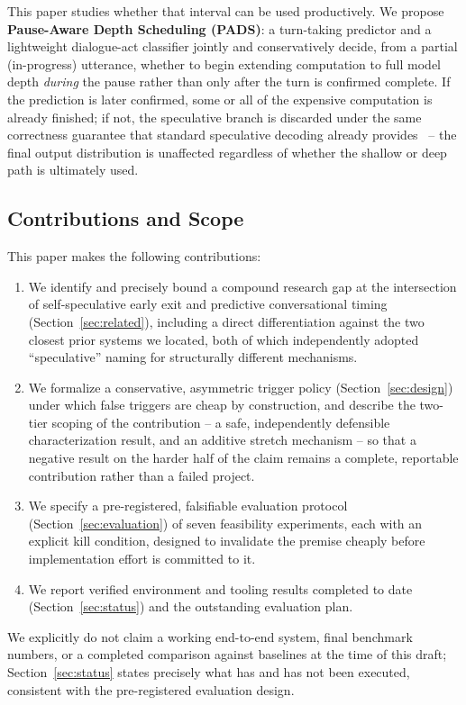 \documentclass[journal]{IEEEtran}
\begin{document}
This paper studies whether that interval can be used productively. We propose \textbf{Pause-Aware Depth Scheduling (PADS)}: a turn-taking predictor and a lightweight dialogue-act classifier jointly and conservatively decide, from a partial (in-progress) utterance, whether to begin extending computation to full model depth \emph{during} the pause rather than only after the turn is confirmed complete. If the prediction is later confirmed, some or all of the expensive computation is already finished; if not, the speculative branch is discarded under the same correctness guarantee that standard speculative decoding already provides~\cite{leviathan2023fast} -- the final output distribution is unaffected regardless of whether the shallow or deep path is ultimately used.

\subsection{Contributions and Scope}
This paper makes the following contributions:
\begin{enumerate}
    \item We identify and precisely bound a compound research gap at the intersection of self-speculative early exit and predictive conversational timing (Section~\ref{sec:related}), including a direct differentiation against the two closest prior systems we located, both of which independently adopted ``speculative'' naming for structurally different mechanisms.
    \item We formalize a conservative, asymmetric trigger policy (Section~\ref{sec:design}) under which false triggers are cheap by construction, and describe the two-tier scoping of the contribution -- a safe, independently defensible characterization result, and an additive stretch mechanism -- so that a negative result on the harder half of the claim remains a complete, reportable contribution rather than a failed project.
    \item We specify a pre-registered, falsifiable evaluation protocol (Section~\ref{sec:evaluation}) of seven feasibility experiments, each with an explicit kill condition, designed to invalidate the premise cheaply before implementation effort is committed to it.
    \item We report verified environment and tooling results completed to date (Section~\ref{sec:status}) and the outstanding evaluation plan.
\end{enumerate}

We explicitly do not claim a working end-to-end system, final benchmark numbers, or a completed comparison against baselines at the time of this draft; Section~\ref{sec:status} states precisely what has and has not been executed, consistent with the pre-registered evaluation design.
\end{document}

